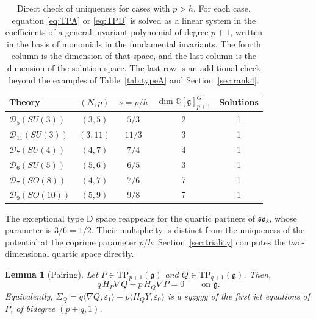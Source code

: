 \documentclass[10pt,reqno]{amsart}
\numberwithin{equation}{section}
\theoremstyle{plain}
\newtheorem{lemma}[theorem]{Lemma}
\theoremstyle{definition}
\newcommand{\TP}{\mathrm{TP}}
\newcommand{\ip}[2]{\langle #1, #2\rangle}
\begin{document}
\begin{table}[H]
\centering
\renewcommand{\arraystretch}{1.12}
\begin{tabular}{@{\phantom{T}}lcccc@{\phantom{T}}}
\toprule
Theory & $(N,p)$ & $\nu=p/h$ & $\dim \mathbb{C}[\mathfrak g]^{G}_{p+1}$ & Solutions\\\midrule
$\mathcal{D}_5(SU(3))$    & $(3,5)$  & $5/3$  & 2 & 1\\
$\mathcal{D}_{11}(SU(3))$ & $(3,11)$ & $11/3$ & 3 & 1\\
$\mathcal{D}_7(SU(4))$    & $(4,7)$  & $7/4$  & 4 & 1\\
$\mathcal{D}_6(SU(5))$    & $(5,6)$  & $6/5$  & 3 & 1\\
$\mathcal{D}_7(SO(8))$    & $(4,7)$  & $7/6$  & 7 & 1\\
$\mathcal{D}_9(SO(10))$   & $(5,9)$  & $9/8$  & 7 & 1\\\bottomrule
\end{tabular}
\caption{Direct check of uniqueness for cases with $p>h$. For each case, equation \eqref{eq:TPA} or \eqref{eq:TPD} is solved as a linear system in the coefficients of a general invariant polynomial of degree $p+1$, written in the basis of monomials in the fundamental invariants. The fourth column is the dimension of that space, and the last column is the dimension of the solution space. The last row is an additional check beyond the examples of Table~\ref{tab:typeA} and Section~\ref{sec:rank4}.}
\label{tab:FScheck}
\end{table}

The exceptional type D space reappears for the quartic partners of $\mathfrak{so}_8$, whose parameter is $3/6=1/2$. Their multiplicity is distinct from the uniqueness of the potential at the coprime parameter $p/h$; Section~\ref{sec:triality} computes the two-dimensional quartic space directly.

\begin{lemma}[Pairing]\label{lem:pairing}
Let $P\in\TP_{p+1}(\mathfrak{g})$ and $Q\in\TP_{q+1}(\mathfrak{g})$. Then,
\begin{equation}\label{eq:pairing}
	q\,H_P\nabla Q-p\,H_Q\nabla P=0\qquad\text{on }\mathfrak{g} .
\end{equation}
Equivalently, $\Sigma_Q=q\ip{\nabla Q}{\varepsilon_1}-p\ip{H_QY}{\varepsilon_0}$ is a syzygy of the first jet equations of $P$, of bidegree $(p+q,1)$.
\end{lemma}
\end{document}
